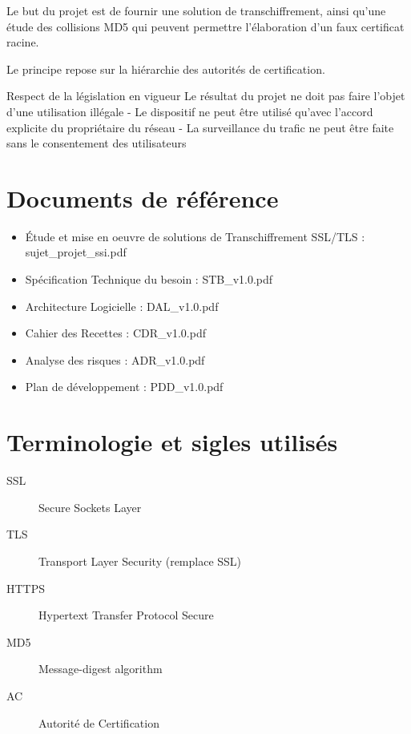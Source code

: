 \documentclass[a4paper,11pt,french]{article}
\begin{document}
Le but du projet est de fournir une solution de transchiffrement, ainsi qu'une étude des collisions MD5 qui peuvent permettre l'élaboration d'un faux certificat racine.

Le principe repose sur la hiérarchie des autorités de certification.


Respect de la législation en vigueur
Le résultat du projet ne doit pas faire l'objet d'une utilisation illégale
- Le dispositif ne peut être utilisé qu'avec l'accord explicite du propriétaire du réseau
- La surveillance du trafic ne peut être faite sans le consentement des utilisateurs
\newpage
\section{Documents de référence}

\begin{itemize}
\item Étude et mise en oeuvre de solutions de Transchiffrement SSL/TLS : sujet\_projet\_ssi.pdf
\item Spécification Technique du besoin : STB\_v1.0.pdf
\item Architecture Logicielle : DAL\_v1.0.pdf
\item Cahier des Recettes : CDR\_v1.0.pdf
\item Analyse des risques : ADR\_v1.0.pdf
\item Plan de développement : PDD\_v1.0.pdf
\end{itemize}

\newpage
\section{Terminologie et sigles utilisés}

\begin{description}
\item[SSL] Secure Sockets Layer
\item[TLS] Transport Layer Security (remplace SSL)
\item[HTTPS] Hypertext Transfer Protocol Secure
\item[MD5] Message-digest algorithm
\item[AC] Autorité de Certification
\end{description}

\end{document}
